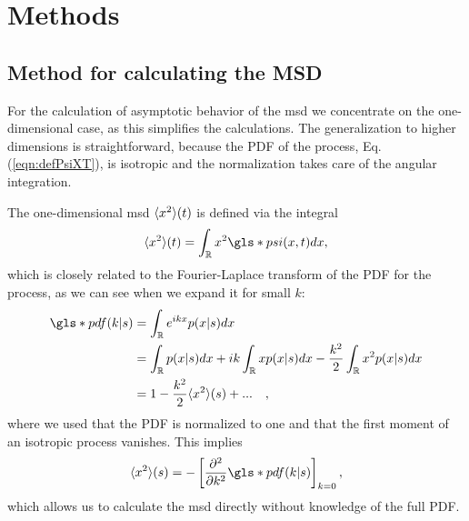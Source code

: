 \chapter{Methods}

\section{Method for calculating the MSD} 

For the calculation of asymptotic behavior of the \gls*{msd} we concentrate on the one-dimensional case, as this simplifies the calculations. The generalization to higher dimensions is straightforward, because the \gls*{PDF} of the process, Eq. (\ref{eqn:defPsiXT}), is isotropic and the normalization takes care of the angular integration. 

The one-dimensional \gls*{msd} $\langle x^2 \rangle(t)$ is defined via the integral 
%
\begin{align}
\mean{x^2}(t) = \int_{\mathbb{R}} x^2 \gls*{psi}(x,t) dx ,
\end{align}
%
which is closely related to the Fourier-Laplace transform of the \gls*{PDF} for the process, as we can see when we expand it for small $k$:
%
\begin{align}
\gls*{pdf}(k|s) &= \int_{\mathbb{R}}  e^{ik x} p(x|s) dx  \\
&= \int_{\mathbb{R}}   p(x|s) dx +  i k \int_{\mathbb{R}}   x p(x|s) dx - \frac{k^2}{2} \int_{\mathbb{R}}   x^2 p(x|s) dx \\
&= 1 - \frac{k^2}{2} \mean{x^2}(s)  + ... \quad ,
\end{align}
%
where we used that the \gls*{PDF} is normalized to one and that the first moment of an isotropic process vanishes. This implies 
%
\begin{align}
\mean{x^2}(s) = - \left[ \npder{}{k}{2} \gls*{pdf}(k|s) \right]_{k=0} \label{eqn:MSDDerivative}, 
\end{align}
%
which allows us to calculate the \gls*{msd} directly without knowledge of the full \gls*{PDF}.

